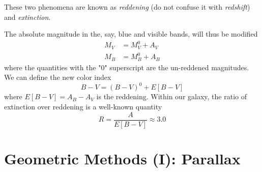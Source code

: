 \par These two phenomena are known as \emph{reddening} (do not confuse it with \emph{redshift}) and \emph{extinction}.
\par The absolute magnitude in the, say, blue and visible bands, will thus be modified
\begin{align*}
    M_{V} &= M_{V}^{0}+A_{V}\\
    M_{B} &= M_{B}^{0}+A_{B}
\end{align*} 
where the quantities with the "0" superscript are the un-reddened magnitudes. We can define the new color index
\begin{equation*}
    B-V = (B-V)^{0}+E[B-V]
\end{equation*}
where $E[B-V] = A_{B}-A_{V}$ is the reddening. Within our galaxy, the ratio of extinction over reddening is a well-known quantity
\begin{equation*}
    R = \frac{A}{E[B-V]} \approx 3.0
\end{equation*}

\section{Geometric Methods (I): Parallax}


